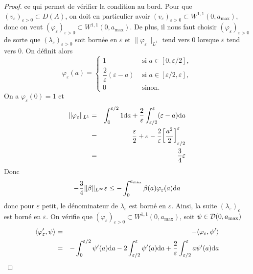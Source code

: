 \begin{proof}
    ce qui permet de vérifier la condition au bord. Pour que $(v_{\varepsilon})_{\varepsilon >0} \subset D(A)$, on doit en particulier avoir $(v_{\varepsilon})_{\varepsilon >0} \subset W^{1,1}(0,a_{\max})$, donc on veut $(\varphi_{\varepsilon})_{\varepsilon >0} \subset W^{1,1}(0,a_{\max})$. De plus, il nous faut choisir $(\varphi_{\varepsilon})_{\varepsilon >0}$ de sorte que $(\lambda_{\varepsilon})_{\varepsilon >0}$ soit bornée en $\varepsilon$ et $\|\varphi_{\varepsilon}\|_{L^1}$ tend vers $0$ lorsque $\varepsilon$ tend vers $0$. On définit alors 
    \begin{equation*}
        \varphi_{\varepsilon}(a) = \left\{\begin{array}{cl}
            1 & \text{ si } a \in [0,\varepsilon/2], \\
            \dfrac{2}{\varepsilon}(\varepsilon-a) & \text{ si } a \in [\varepsilon/2, \varepsilon], \\
            0 & \text{ sinon.}
        \end{array}\right.
    \end{equation*}
    On a $\varphi_{\varepsilon}(0)=1$ et
    \begin{eqnarray*}
        \|\varphi_{\varepsilon}\|_{L^1} &=& \int_0^{\varepsilon/2}1\mathrm{d} a + \frac{2}{\varepsilon}\int_{\varepsilon/2}^{\varepsilon}(\varepsilon-a)\mathrm{d} a \\
        &=& \frac{\varepsilon}{2} + \varepsilon - \frac{2}{\varepsilon}\bigg[\frac{a^2}{2}\bigg]^{\varepsilon}_{\varepsilon/2} \\
        &=& \frac{3}{4}\varepsilon
    \end{eqnarray*}
    Donc 
    \begin{equation*}
        -\frac{3}{4}\|\beta\|_{L^\infty}\varepsilon \leq - \int_0^{a_{\max}} \beta(a) \varphi_{\varepsilon}(a)\mathrm{d} a
    \end{equation*}
    donc pour $\varepsilon$ petit, le dénominateur de $\lambda_{\varepsilon}$ est borné en $\varepsilon$. Ainsi, la suite $(\lambda_{\varepsilon})_{\varepsilon}$ est borné en $\varepsilon$. On vérifie que $(\varphi_{\varepsilon})_{\varepsilon >0} \subset W^{1,1}(0,a_{\max})$, soit $\psi \in \mathcal{D}(0,a_{\max})$
    \begin{eqnarray*}
        \langle \varphi_{\varepsilon}', \psi\rangle &=& -\langle \varphi_{\varepsilon}, \psi'\rangle \\
        &=& - \int_0^{\varepsilon/2}\psi'(a)\d a - 2\int_{\varepsilon/2}^{\varepsilon}\psi'(a)\d a + \frac{2}{\varepsilon} \int_{\varepsilon/2}^{\varepsilon} a \psi'(a)\d a \\

\end{eqnarray*}
\end{proof}
